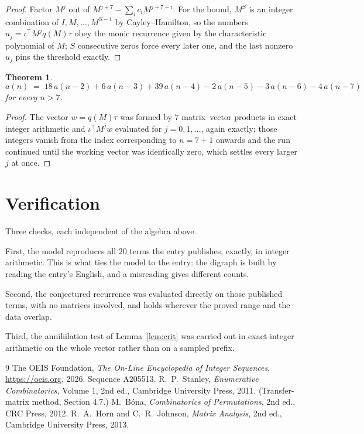 \documentclass[11pt,a4paper]{article}
\theoremstyle{plain}
\newtheorem{theorem}{Theorem}
\theoremstyle{definition}
\begin{document}
\begin{proof}
Factor $M^{j}$ out of $M^{j+7}-\sum_ic_iM^{j+7-i}$. For the bound, $M^{S}$
is an integer combination of $I,M,\dots,M^{S-1}$ by Cayley--Hamilton, so the numbers
$u_j=\iota^{\!\top}M^{j}q(M)\tau$ obey the monic recurrence given by the characteristic
polynomial of $M$; $S$ consecutive zeros force every later one, and the last nonzero $u_j$
pins the threshold exactly.
\end{proof}

\begin{theorem}
\[
a(n)\;=\;18\,a(n-2) + 6\,a(n-3) + 39\,a(n-4) - 2\,a(n-5) - 3\,a(n-6) - 4\,a(n-7)
\]
for every $n>7$.
\end{theorem}

\begin{proof}
The vector $w=q(M)\tau$ was formed by $7$ matrix--vector products in exact integer
arithmetic and $\iota^{\!\top}M^{j}w$ evaluated for $j=0,1,\dots$, again exactly; those
integers vanish from the index corresponding to $n=7+1$ onwards and the run continued
until the working vector was identically zero, which settles every larger $j$ at once.
\end{proof}

\section{Verification}

Three checks, each independent of the algebra above.

First, the model reproduces all $20$ terms the entry publishes, exactly, in integer
arithmetic. This is what ties the model to the entry: the digraph is built by reading the
entry's English, and a misreading gives different counts.

Second, the conjectured recurrence was evaluated directly on those published terms, with no
matrices involved, and holds wherever the proved range and the data overlap.

Third, the annihilation test of Lemma~\ref{lem:crit} was carried out in exact integer
arithmetic on the whole vector rather than on a sampled prefix.

\begin{thebibliography}{9}
 The OEIS Foundation, \emph{The On-Line Encyclopedia of Integer
Sequences}, \url{https://oeis.org}, 2026. Sequence A205513.
 R.~P.~Stanley, \emph{Enumerative Combinatorics}, Volume 1, 2nd ed.,
Cambridge University Press, 2011. (Transfer-matrix method, Section 4.7.)
 M.~B\'ona, \emph{Combinatorics of Permutations}, 2nd ed., CRC
Press, 2012.
 R.~A.~Horn and C.~R.~Johnson, \emph{Matrix Analysis}, 2nd ed., Cambridge
University Press, 2013.
\end{thebibliography}
\end{document}
